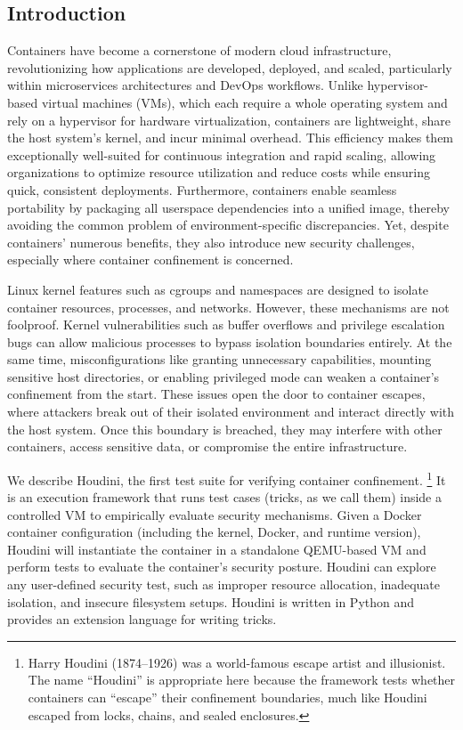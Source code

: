 \fontsize{12pt}{14pt} \selectfont
\begin{doublespace}
\chapter{Introduction}

Containers have become a cornerstone of modern cloud infrastructure, revolutionizing how applications are developed, deployed, and scaled, particularly within microservices architectures and DevOps workflows. Unlike hypervisor-based virtual machines (VMs), which each require a whole operating system and rely on a hypervisor for hardware virtualization, containers are lightweight, share the host system's kernel, and incur minimal overhead. This efficiency makes them exceptionally well-suited for continuous integration and rapid scaling, allowing organizations to optimize resource utilization and reduce costs while ensuring quick, consistent deployments. Furthermore, containers enable seamless portability by packaging all userspace dependencies into a unified image, thereby avoiding the common problem of environment-specific discrepancies. Yet, despite containers' numerous benefits, they also introduce new security challenges, especially where container confinement is concerned.

Linux kernel features such as \gls{cgroups} and \gls{namespaces} are designed to isolate container resources, processes, and networks. However, these mechanisms are not foolproof. Kernel vulnerabilities such as buffer overflows and privilege escalation bugs can allow malicious processes to bypass isolation boundaries entirely. At the same time, misconfigurations like granting unnecessary capabilities, mounting sensitive host directories, or enabling privileged mode can weaken a container's confinement from the start. These issues open the door to container escapes, where attackers break out of their isolated environment and interact directly with the host system. Once this boundary is breached, they may interfere with other containers, access sensitive data, or compromise the entire infrastructure.

We describe \gls{Houdini}, the first test suite for verifying container confinement. \footnote{Harry Houdini (1874–1926) was a world-famous escape artist and illusionist. The name “Houdini” is appropriate here because the framework tests whether containers can “escape” their confinement boundaries, much like Houdini escaped from locks, chains, and sealed enclosures.} It is an execution framework that runs test cases (\glspl{trick}, as we call them) inside a controlled VM to empirically evaluate security mechanisms. Given a \gls{Docker} container configuration (including the kernel, Docker, and runtime version), Houdini will instantiate the container in a standalone QEMU-based VM and perform tests to evaluate the container's security posture. Houdini can explore any user-defined security test, such as improper resource allocation, inadequate isolation, and insecure filesystem setups. Houdini is written in Python and provides an extension language for writing tricks.


\end{doublespace}
